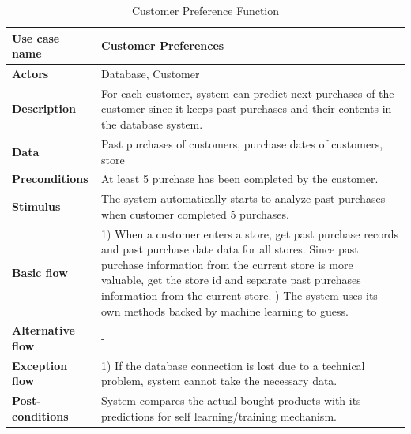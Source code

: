  \begin{table}[H]
     \centering
     \begin{tabular}{ | l | p{10cm} |}
     \hline
     \textbf{Use case name}    & Customer Preferences \\
     \hline
     \textbf{Actors}           & Database, Customer \\
     \hline
     \textbf{Description}      & For each customer, system can predict next purchases of the customer since it keeps past purchases and their contents in the database system. \\
     \hline
     \textbf{Data}             & Past purchases of customers, purchase dates of customers, store \\
     \hline
     \textbf{Preconditions}    & At least 5 purchase has been completed by the customer. \\
     \hline
     \textbf{Stimulus}         & The system automatically starts to analyze past purchases when customer completed 5 purchases. \\
     \hline
     \textbf{Basic flow}       & 1) When a customer enters a store, get past purchase records and past purchase date data for all stores. Since past purchase information from the current store is more valuable, get the store id and separate past purchases information from the current store. 
     \newline 2) The system uses its own methods backed by machine learning to guess. \\
     \hline
     \textbf{Alternative flow} & - \\
     \hline
     \textbf{Exception flow}   & 1) If the database connection is lost due to a technical problem, system cannot take the necessary data. \\
     \hline
     \textbf{Post-conditions}  & System compares the actual bought products with its predictions for self learning/training mechanism. \\
     \hline
     \end{tabular} \caption{Customer Preference Function}
     \label{tab:customer_preference}
 \end{table}
 
 
